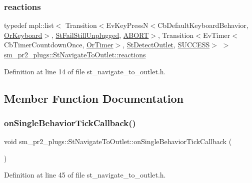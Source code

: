 \subsubsection{\texorpdfstring{reactions}{reactions}}
{\footnotesize\ttfamily typedef mpl\+::list$<$ Transition$<$Ev\+Key\+PressN$<$Cb\+Default\+Keyboard\+Behavior, \hyperlink{classsm__pr2__plugs_1_1OrKeyboard}{Or\+Keyboard}$>$, \hyperlink{structsm__pr2__plugs_1_1StFailStillUnplugged}{St\+Fail\+Still\+Unplugged}, \hyperlink{classABORT}{A\+B\+O\+RT}$>$, Transition$<$Ev\+Timer$<$Cb\+Timer\+Countdown\+Once, \hyperlink{classsm__pr2__plugs_1_1OrTimer}{Or\+Timer}$>$, \hyperlink{structsm__pr2__plugs_1_1StDetectOutlet}{St\+Detect\+Outlet}, \hyperlink{classSUCCESS}{S\+U\+C\+C\+E\+SS}$>$ $>$ \hyperlink{structsm__pr2__plugs_1_1StNavigateToOutlet_a4b5b4d30a2a64c438e9a4d89016fc052}{sm\+\_\+pr2\+\_\+plugs\+::\+St\+Navigate\+To\+Outlet\+::reactions}}



Definition at line 14 of file st\+\_\+navigate\+\_\+to\+\_\+outlet.\+h.



\subsection{Member Function Documentation}
\mbox{\label{structsm__pr2__plugs_1_1StNavigateToOutlet_ae6a6ee95bcc854792f0b16286a113a06}} 
\subsubsection{\texorpdfstring{on\+Single\+Behavior\+Tick\+Callback()}{onSingleBehaviorTickCallback()}}
{\footnotesize\ttfamily void sm\+\_\+pr2\+\_\+plugs\+::\+St\+Navigate\+To\+Outlet\+::on\+Single\+Behavior\+Tick\+Callback (\begin{DoxyParamCaption}{ }\end{DoxyParamCaption})\hspace{0.3cm}{\ttfamily [inline]}}



Definition at line 45 of file st\+\_\+navigate\+\_\+to\+\_\+outlet.\+h.



